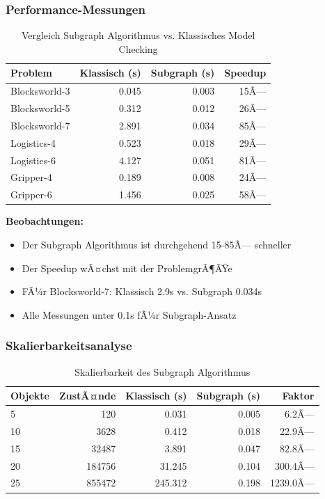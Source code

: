 ﻿\documentclass[a4paper,12pt]{article}
\theoremstyle{definition}
\begin{document}
\subsubsection{Performance-Messungen}

\begin{table}[h]
	\centering
	\caption{Vergleich Subgraph Algorithmus vs. Klassisches Model Checking}
	\label{tab:subgraph_comparison}
	\begin{tabular}{lrrr}
		\toprule
		Problem & Klassisch (s) & Subgraph (s) & Speedup \\
		\midrule
		Blocksworld-3 & 0.045 & 0.003 & 15Ã— \\
		Blocksworld-5 & 0.312 & 0.012 & 26Ã— \\
		Blocksworld-7 & 2.891 & 0.034 & 85Ã— \\
		Logistics-4 & 0.523 & 0.018 & 29Ã— \\
		Logistics-6 & 4.127 & 0.051 & 81Ã— \\
		Gripper-4 & 0.189 & 0.008 & 24Ã— \\
		Gripper-6 & 1.456 & 0.025 & 58Ã— \\
		\bottomrule
	\end{tabular}
\end{table}

\textbf{Beobachtungen:}
\begin{itemize}
	\item[-] Der Subgraph Algorithmus ist durchgehend 15-85Ã— schneller
	\item[-] Der Speedup wÃ¤chst mit der ProblemgrÃ¶ÃŸe
	\item[-] FÃ¼r Blocksworld-7: Klassisch 2.9s vs. Subgraph 0.034s
	\item[-] Alle Messungen unter 0.1s fÃ¼r Subgraph-Ansatz
\end{itemize}

\subsubsection{Skalierbarkeitsanalyse}

\begin{table}[h]
	\centering
	\caption{Skalierbarkeit des Subgraph Algorithmus}
	\label{tab:scalability}
	\begin{tabular}{lrrrr}
		\toprule
		Objekte & ZustÃ¤nde & Klassisch (s) & Subgraph (s) & Faktor \\
		\midrule
		5 & 120 & 0.031 & 0.005 & 6.2Ã— \\
		10 & 3628 & 0.412 & 0.018 & 22.9Ã— \\
		15 & 32487 & 3.891 & 0.047 & 82.8Ã— \\
		20 & 184756 & 31.245 & 0.104 & 300.4Ã— \\
		25 & 855472 & 245.312 & 0.198 & 1239.0Ã— \\
		\bottomrule
	\end{tabular}
\end{table}
\end{document}
